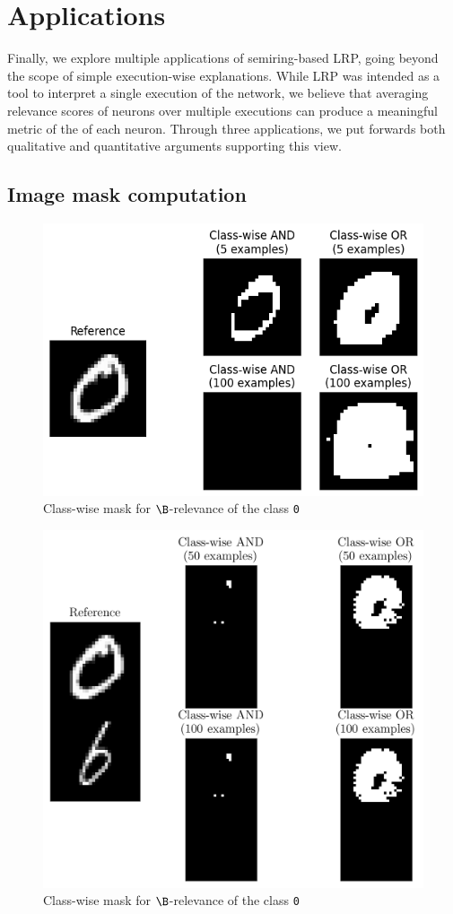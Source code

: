 \documentclass{../cs-classes/cs-classes}
\newcommand*{\1}{\digitsbb{1}}
\newcommand*{\0}{\digitsbb{0}}
\begin{document}
\section{Applications}
Finally, we explore multiple applications of semiring-based LRP, going beyond the scope of simple execution-wise explanations. While LRP was intended as a tool to interpret a single execution of the network, we believe that averaging relevance scores of neurons over multiple executions can produce a meaningful metric of the  of each neuron. Through three applications, we put forwards both qualitative and quantitative arguments supporting this view.

\subsection{Image mask computation}
\begin{figure}[H]
    \centering
    \includegraphics[width=.5\textwidth]{boolean-mask.png}
    \caption{Class-wise mask for $\B$-relevance of the class \texttt{0}}
\end{figure}

\begin{figure}[H]
    \centering
    \includegraphics[width=.5\textwidth]{dmnist-boolean-mask.png}
    \caption{Class-wise mask for $\B$-relevance of the class \texttt{0}}
\end{figure}
\end{document}
